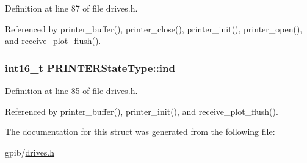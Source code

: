 Definition at line 87 of file drives.\+h.



Referenced by printer\+\_\+buffer(), printer\+\_\+close(), printer\+\_\+init(), printer\+\_\+open(), and receive\+\_\+plot\+\_\+flush().

\subsubsection[{\texorpdfstring{ind}{ind}}]{\setlength{\rightskip}{0pt plus 5cm}int16\+\_\+t P\+R\+I\+N\+T\+E\+R\+State\+Type\+::ind}\hypertarget{structPRINTERStateType_a7d8873d0011f31d7dd00c2b7e0d362bd}{}\label{structPRINTERStateType_a7d8873d0011f31d7dd00c2b7e0d362bd}


Definition at line 85 of file drives.\+h.



Referenced by printer\+\_\+buffer(), printer\+\_\+init(), and receive\+\_\+plot\+\_\+flush().



The documentation for this struct was generated from the following file\+:\begin{DoxyCompactItemize}
\item 
gpib/\hyperlink{drives_8h}{drives.\+h}\end{DoxyCompactItemize}
